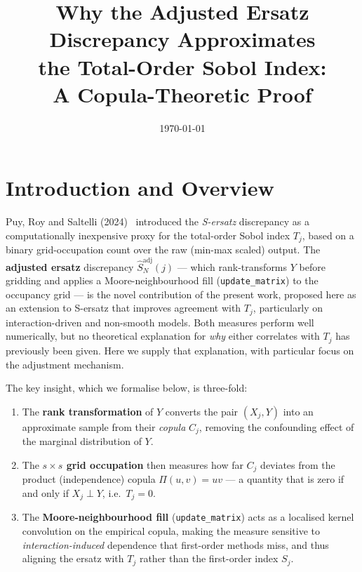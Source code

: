 \documentclass[11pt,a4paper]{article}
\title{\large\bfseries Why the Adjusted Ersatz Discrepancy Approximates\\
the Total-Order Sobol Index:\\[4pt]
\normalsize A Copula-Theoretic Proof}
\author{}
\date{\today}
\theoremstyle{definition}
\begin{document}
\maketitle
\tableofcontents
\bigskip

\section{Introduction and Overview}

Puy, Roy and Saltelli (2024)~\cite{puy2024} introduced the
\emph{S-ersatz} discrepancy as a computationally inexpensive proxy for
the total-order Sobol index $T_j$, based on a binary grid-occupation
count over the raw (min-max scaled) output. The \textbf{adjusted ersatz}
discrepancy $\hat{S}^{\mathrm{adj}}_N(j)$ — which rank-transforms $Y$
before gridding and applies a Moore-neighbourhood fill
(\texttt{update\_matrix}) to the occupancy grid — is the novel
contribution of the present work, proposed here as an extension to S-ersatz
that improves agreement with $T_j$, particularly on interaction-driven and
non-smooth models. Both measures perform well numerically, but no
theoretical explanation for \emph{why} either correlates with $T_j$ has
previously been given. Here we supply that explanation, with particular
focus on the adjustment mechanism.

The key insight, which we formalise below, is three-fold:

\begin{enumerate}[leftmargin=*]
\item The \textbf{rank transformation} of $Y$ converts the pair
      $(X_j, Y)$ into an approximate sample from their \emph{copula}
      $C_j$, removing the confounding effect of the marginal
      distribution of $Y$.
\item The \textbf{$s \times s$ grid occupation} then measures how
      far $C_j$ deviates from the product (independence) copula
      $\Pi(u,v) = uv$ — a quantity that is zero if and only if
      $X_j \perp Y$, i.e.\ $T_j = 0$.
\item The \textbf{Moore-neighbourhood fill} (\texttt{update\_matrix})
      acts as a localised kernel convolution on the empirical copula,
      making the measure sensitive to \emph{interaction-induced}
      dependence that first-order methods miss, and thus aligning the
      ersatz with $T_j$ rather than the first-order index $S_j$.
\end{enumerate}
\end{document}
